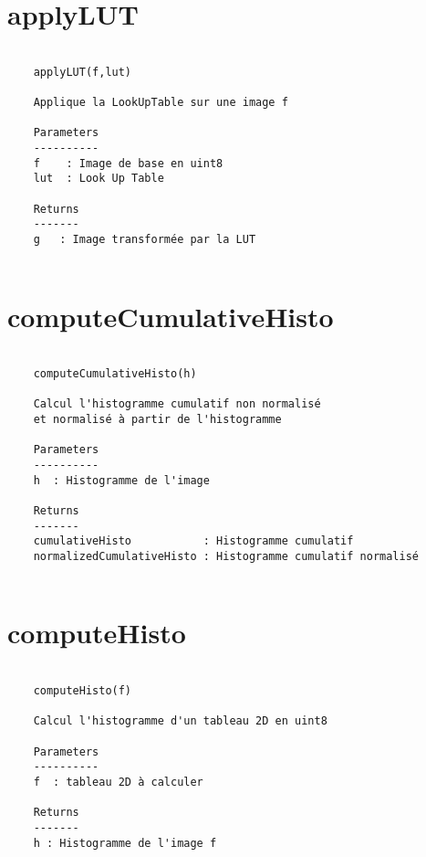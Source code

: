 \section{applyLUT}
\begin{lstlisting}[style=docstringstyle]

    applyLUT(f,lut)
    
    Applique la LookUpTable sur une image f
    
    Parameters
    ----------
    f    : Image de base en uint8
    lut  : Look Up Table

    Returns
    -------
    g   : Image transformée par la LUT 
    
\end{lstlisting}
\section{computeCumulativeHisto}
\begin{lstlisting}[style=docstringstyle]

    computeCumulativeHisto(h)
    
    Calcul l'histogramme cumulatif non normalisé
    et normalisé à partir de l'histogramme
    
    Parameters
    ----------
    h  : Histogramme de l'image

    Returns
    -------
    cumulativeHisto           : Histogramme cumulatif 
    normalizedCumulativeHisto : Histogramme cumulatif normalisé
    
\end{lstlisting}
\section{computeHisto}
\begin{lstlisting}[style=docstringstyle]

    computeHisto(f)
    
    Calcul l'histogramme d'un tableau 2D en uint8
    
    Parameters
    ----------
    f  : tableau 2D à calculer 

    Returns
    -------
    h : Histogramme de l'image f
    
\end{lstlisting}

